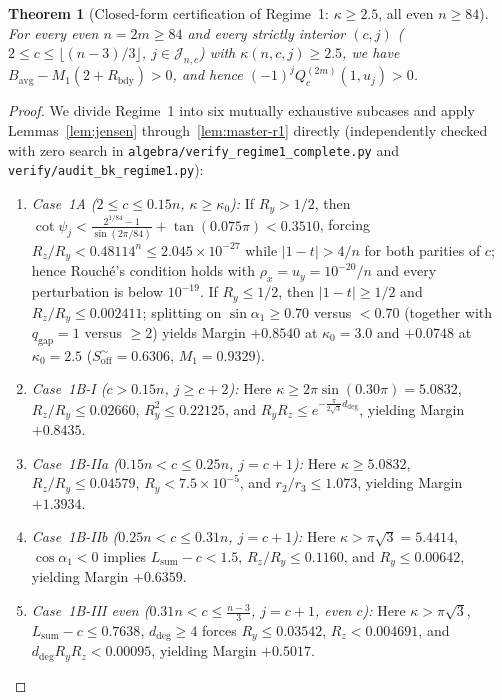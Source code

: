 \documentclass[10pt]{article}
\numberwithin{equation}{section}
\theoremstyle{plain}
\newtheorem{theorem}{Theorem}[section]
\theoremstyle{definition}
\newcommand{\1}{\mathbf{1}}
\newcommand{\code}[1]{\texttt{#1}}
\begin{document}
\begin{theorem}[Closed-form certification of Regime~1: $\kappa \ge 2.5$, all even $n \ge 84$]\label{thm:regime1}
For every even $n = 2m \ge 84$ and every strictly interior $(c, j)$ ($2 \le c \le \lfloor (n-3)/3 \rfloor$, $j \in \mathcal{J}_{n,c}$) with $\kappa(n, c, j) \ge 2.5$, we have $B_{\mathrm{avg}} - M_1(2 + R_{\mathrm{bdy}}) > 0$, and hence $(-1)^j Q_c^{(2m)}(1, u_j) > 0$.
\end{theorem}

\begin{proof}
We divide Regime~1 into six mutually exhaustive subcases and apply Lemmas~\ref{lem:jensen} through~\ref{lem:master-r1} directly (independently checked with zero search in \code{algebra/verify\_regime1\_complete.py} and \code{verify/audit\_bk\_regime1.py}):
\begin{enumerate}[label=(\arabic*)]
    \item \emph{Case~1A ($2 \le c \le 0.15n$, $\kappa \ge \kappa_0$):} If $R_y > 1/2$, then $\cot\psi_j < \frac{2^{1/84}-1}{\sin(2\pi/84)} + \tan(0.075\pi) < 0.3510$, forcing $R_z/R_y < 0.48114^n \le 2.045 \times 10^{-27}$ while $|1 - t| > 4/n$ for both parities of $c$; hence Rouch\'e's condition holds with $\rho_x = u_y = 10^{-20}/n$ and every perturbation is below $10^{-19}$. If $R_y \le 1/2$, then $|1 - t| \ge 1/2$ and $R_z/R_y \le 0.002411$; splitting on $\sin\alpha_1 \ge 0.70$ versus $< 0.70$ (together with $q_{\mathrm{gap}} = 1$ versus $\ge 2$) yields Margin $+0.8540$ at $\kappa_0 = 3.0$ and $+0.0748$ at $\kappa_0 = 2.5$ ($S_{\mathrm{off}}^\sim = 0.6306$, $M_1 = 0.9329$).
    \item \emph{Case~1B-I ($c > 0.15n$, $j \ge c + 2$):} Here $\kappa \ge 2\pi\sin(0.30\pi) = 5.0832$, $R_z/R_y \le 0.02660$, $R_y^2 \le 0.22125$, and $R_y R_z \le e^{-\frac{\pi}{2\sqrt{3}} d_{\mathrm{deg}}}$, yielding Margin $+0.8435$.
    \item \emph{Case~1B-IIa ($0.15n < c \le 0.25n$, $j = c + 1$):} Here $\kappa \ge 5.0832$, $R_z/R_y \le 0.04579$, $R_y < 7.5 \times 10^{-5}$, and $r_2/r_3 \le 1.073$, yielding Margin $+1.3934$.
    \item \emph{Case~1B-IIb ($0.25n < c \le 0.31n$, $j = c + 1$):} Here $\kappa > \pi\sqrt{3} = 5.4414$, $\cos\alpha_1 < 0$ implies $L_{\mathrm{sum}} - c < 1.5$, $R_z/R_y \le 0.1160$, and $R_y \le 0.00642$, yielding Margin $+0.6359$.
    \item \emph{Case~1B-III even ($0.31n < c \le \frac{n-3}{3}$, $j = c + 1$, even $c$):} Here $\kappa > \pi\sqrt{3}$, $L_{\mathrm{sum}} - c \le 0.7638$, $d_{\mathrm{deg}} \ge 4$ forces $R_y \le 0.03542$, $R_z < 0.004691$, and $d_{\mathrm{deg}} R_y R_z < 0.00095$, yielding Margin $+0.5017$.

\end{enumerate}
\end{proof}
\end{document}
